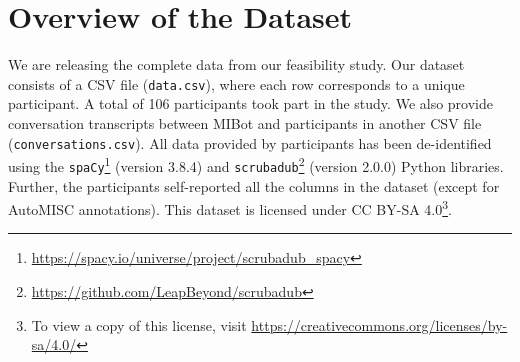 \chapter{Overview of the Dataset}
\label{appendix:dataset_overview}


We are releasing the complete data from our feasibility study. Our dataset consists of a CSV file (\texttt{data.csv}), where each row corresponds to a unique participant. A total of 106 participants took part in the study. We also provide conversation transcripts between MIBot and participants in another CSV file (\texttt{conversations.csv}). All data provided by participants has been de-identified using the \texttt{spaCy}\footnote{\url{https://spacy.io/universe/project/scrubadub_spacy}} (version 3.8.4)
and \texttt{scrubadub}\footnote{\url{https://github.com/LeapBeyond/scrubadub}} (version 2.0.0) Python libraries. Further, the participants self-reported all the columns in the dataset (except for AutoMISC annotations). This dataset is licensed under CC BY-SA 4.0\footnote{To view a copy of this license, visit \url{https://creativecommons.org/licenses/by-sa/4.0/}}.

